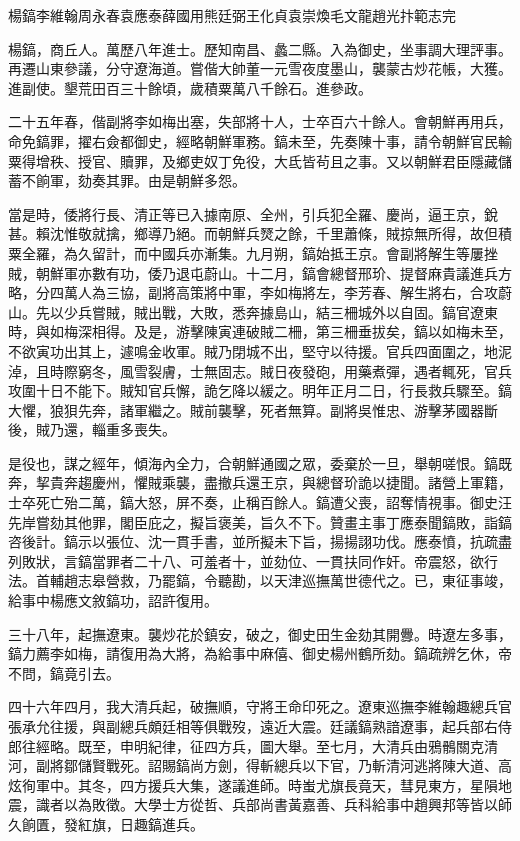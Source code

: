 
\begin{pinyinscope}
楊鎬李維翰周永春袁應泰薛國用熊廷弼王化貞袁崇煥毛文龍趙光抃範志完

楊鎬，商丘人。萬歷八年進士。歷知南昌、蠡二縣。入為御史，坐事調大理評事。再遷山東參議，分守遼海道。嘗偕大帥董一元雪夜度墨山，襲蒙古炒花帳，大獲。進副使。墾荒田百三十餘頃，歲積粟萬八千餘石。進參政。

二十五年春，偕副將李如梅出塞，失部將十人，士卒百六十餘人。會朝鮮再用兵，命免鎬罪，擢右僉都御史，經略朝鮮軍務。鎬未至，先奏陳十事，請令朝鮮官民輸粟得增秩、授官、贖罪，及鄉吏奴丁免役，大氐皆茍且之事。又以朝鮮君臣隱藏儲蓄不餉軍，劾奏其罪。由是朝鮮多怨。

當是時，倭將行長、清正等已入據南原、全州，引兵犯全羅、慶尚，逼王京，銳甚。賴沈惟敬就擒，鄉導乃絕。而朝鮮兵燹之餘，千里蕭條，賊掠無所得，故但積粟全羅，為久留計，而中國兵亦漸集。九月朔，鎬始抵王京。會副將解生等屢挫賊，朝鮮軍亦數有功，倭乃退屯蔚山。十二月，鎬會總督邢玠、提督麻貴議進兵方略，分四萬人為三協，副將高策將中軍，李如梅將左，李芳春、解生將右，合攻蔚山。先以少兵嘗賊，賊出戰，大敗，悉奔據島山，結三柵城外以自固。鎬官遼東時，與如梅深相得。及是，游擊陳寅連破賊二柵，第三柵垂拔矣，鎬以如梅未至，不欲寅功出其上，遽鳴金收軍。賊乃閉城不出，堅守以待援。官兵四面圍之，地泥淖，且時際窮冬，風雪裂膚，士無固志。賊日夜發砲，用藥煮彈，遇者輒死，官兵攻圍十日不能下。賊知官兵懈，詭乞降以緩之。明年正月二日，行長救兵驟至。鎬大懼，狼狽先奔，諸軍繼之。賊前襲擊，死者無算。副將吳惟忠、游擊茅國器斷後，賊乃還，輜重多喪失。

是役也，謀之經年，傾海內全力，合朝鮮通國之眾，委棄於一旦，舉朝嗟恨。鎬既奔，挈貴奔趨慶州，懼賊乘襲，盡撤兵還王京，與總督玠詭以捷聞。諸營上軍籍，士卒死亡殆二萬，鎬大怒，屏不奏，止稱百餘人。鎬遭父喪，詔奪情視事。御史汪先岸嘗劾其他罪，閣臣庇之，擬旨褒美，旨久不下。贊畫主事丁應泰聞鎬敗，詣鎬咨後計。鎬示以張位、沈一貫手書，並所擬未下旨，揚揚詡功伐。應泰憤，抗疏盡列敗狀，言鎬當罪者二十八、可羞者十，並劾位、一貫扶同作奸。帝震怒，欲行法。首輔趙志皋營救，乃罷鎬，令聽勘，以天津巡撫萬世德代之。已，東征事竣，給事中楊應文敘鎬功，詔許復用。

三十八年，起撫遼東。襲炒花於鎮安，破之，御史田生金劾其開釁。時遼左多事，鎬力薦李如梅，請復用為大將，為給事中麻僖、御史楊州鶴所劾。鎬疏辨乞休，帝不問，鎬竟引去。

四十六年四月，我大清兵起，破撫順，守將王命印死之。遼東巡撫李維翰趣總兵官張承允往援，與副總兵頗廷相等俱戰歿，遠近大震。廷議鎬熟諳遼事，起兵部右侍郎往經略。既至，申明紀律，征四方兵，圖大舉。至七月，大清兵由鴉鶻關克清河，副將鄒儲賢戰死。詔賜鎬尚方劍，得斬總兵以下官，乃斬清河逃將陳大道、高炫徇軍中。其冬，四方援兵大集，遂議進師。時蚩尤旗長竟天，彗見東方，星隕地震，識者以為敗徵。大學士方從哲、兵部尚書黃嘉善、兵科給事中趙興邦等皆以師久餉匱，發紅旗，日趣鎬進兵。


\end{pinyinscope}
